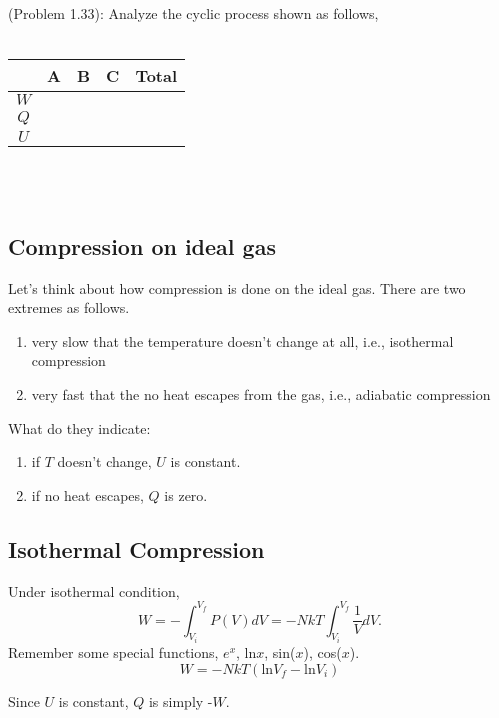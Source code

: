 (Problem 1.33):
Analyze the cyclic process shown as follows,\\\\

\begin{tabular}{|c | c | c | c | c |}
\hline
    & A & B & C & Total \\\hline
$W$ &   &   &   &\\\hline
$Q$ &   &   &   &\\\hline
$U$ &   &   &   &\\\hline
\end{tabular}\\\\


\subsection{Compression on ideal gas}
Let's think about how compression is done on the ideal gas. There are two extremes as follows.
\begin{enumerate}
\item{very slow that the temperature doesn't change at all, i.e., isothermal compression}
\item{very fast that the no heat escapes from the gas, i.e., adiabatic compression}
\end{enumerate}
What do they indicate:
\begin{enumerate}
\item{if $T$ doesn't change, $U$ is constant.}
\item{if no heat escapes, $Q$ is zero.}
\end{enumerate}

\subsection{Isothermal Compression}
Under isothermal condition,
\begin{equation} \label{isot} 
 W = -\int_{V_{i}}^{V_{f}} P(V)dV = -NkT \int_{V_{i}}^{V_{f}} \frac{1}{V}dV.
\end{equation}
Remember some special functions, $e^x$, ln$x$, sin($x$), cos($x$).
\begin{equation} \label{isot} 
 W = -NkT(\textrm{ln}V_f - \textrm{ln}V_i)
\end{equation}

Since $U$ is constant, $Q$ is simply -$W$.


